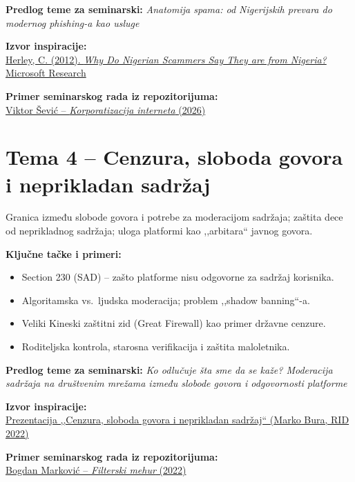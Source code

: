 \documentclass[12pt,a4paper]{article}
\begin{document}
\textbf{Predlog teme za seminarski:}
\emph{Anatomija spama: od Nigerijskih prevara do modernog phishing-a kao usluge}

\textbf{Izvor inspiracije:}\\
\href{https://www.microsoft.com/en-us/research/publication/why-do-nigerian-scammers-say-they-are-from-nigeria/}%
{Herley, C. (2012). \emph{Why Do Nigerian Scammers Say They are from Nigeria?}
Microsoft Research}

\textbf{Primer seminarskog rada iz repozitorijuma:}\\
\href{https://github.com/sanastojanovic/RID/blob/main/rid_2026_seminarski/mi22091_Viktor_\%C5\%A0evi\%C4\%87/seminarski_1.pdf}%
{Viktor Šević -- \emph{Korporatizacija interneta} (2026)}

\section{Tema 4 -- Cenzura, sloboda govora i neprikladan sadržaj}

Granica između slobode govora i potrebe za moderacijom sadržaja; zaštita dece od
neprikladnog sadržaja; uloga platformi kao ,,arbitara`` javnog govora.

\textbf{Ključne tačke i primeri:}
\begin{itemize}
    \item Section 230 (SAD) -- zašto platforme nisu odgovorne za sadržaj korisnika.
    \item Algoritamska vs.\ ljudska moderacija; problem ,,shadow banning``-a.
    \item Veliki Kineski zaštitni zid (Great Firewall) kao primer državne cenzure.
    \item Roditeljska kontrola, starosna verifikacija i zaštita maloletnika.
\end{itemize}

\textbf{Predlog teme za seminarski:}
\emph{Ko odlučuje šta sme da se kaže? Moderacija sadržaja na društvenim mrežama
između slobode govora i odgovornosti platforme}

\textbf{Izvor inspiracije:}\\
\href{https://github.com/sanastojanovic/RID/blob/main/rid_2022_seminarski/mi18141_Marko_Bura/1_predavanje/cenzura_sloboda_govora_i_neprikladan_sadrzaj.pdf}%
{Prezentacija ,,Cenzura, sloboda govora i neprikladan sadržaj`` (Marko Bura, RID 2022)}

\textbf{Primer seminarskog rada iz repozitorijuma:}\\
\href{https://github.com/sanastojanovic/RID/blob/main/rid_2022_seminarski/mi18130_Bogdan_Markovic/predavanje_2/BogdanMarkovicSeminarski.pdf}%
{Bogdan Marković -- \emph{Filterski mehur} (2022)}
\end{document}
